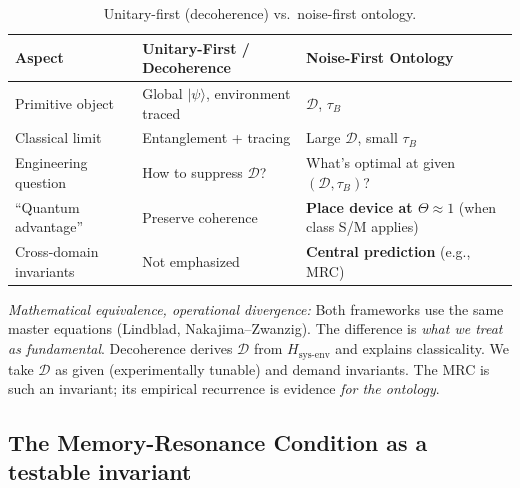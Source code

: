 \documentclass[11pt,letterpaper]{article}
\begin{document}
\begin{table}[h]
\centering
\small
\caption{Unitary-first (decoherence) vs.\ noise-first ontology.}
\label{tab:ontology_comparison}
\begin{tabularx}{0.95\linewidth}{@{}lYY@{}}
\toprule
\textbf{Aspect} & \textbf{Unitary-First / Decoherence} & \textbf{Noise-First Ontology} \\
\midrule
Primitive object & Global $|\psi\rangle$, environment traced & $\mathcal{D}$, $\tau_B$ \\
Classical limit & Entanglement + tracing & Large $\mathcal{D}$, small $\tau_B$ \\
Engineering question & How to suppress $\mathcal{D}$? & What's optimal at given $(\mathcal{D},\tau_B)$? \\
``Quantum advantage'' & Preserve coherence & \textbf{Place device at $\Theta\approx 1$} (when class S/M applies) \\
Cross-domain invariants & Not emphasized & \textbf{Central prediction} (e.g., MRC) \\
\bottomrule
\end{tabularx}
\end{table}

\emph{Mathematical equivalence, operational divergence:} Both frameworks
use the same master equations (Lindblad, Nakajima--Zwanzig). The
difference is \emph{what we treat as fundamental}. Decoherence derives
$\mathcal{D}$ from $H_{\text{sys-env}}$ and explains classicality. We take
$\mathcal{D}$ as given (experimentally tunable) and demand invariants. The
MRC is such an invariant; its empirical recurrence is evidence
\emph{for the ontology}.

\subsection{The Memory-Resonance Condition as a testable invariant}
\end{document}
